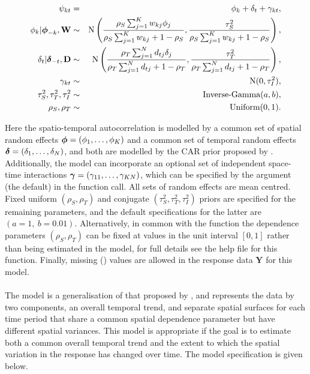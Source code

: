 \documentclass[article, nojss]{jss}
\newcommand{\bd}[1]{\ensuremath{\mbox{\boldmath $#1$}}}
\begin{document}
\begin{eqnarray}
\psi_{kt}&=&\phi_k +  \delta_t   + \gamma_{kt},\label{caranova}\\
\phi_k|\bd{\phi}_{-k},\mathbf{W}&\sim&\mbox{N}\left(\frac{\rho_{S}\sum_{j=1}^Kw_{kj}\phi_j}{\rho_{S}\sum_{j=1}^Kw_{kj} + 1-\rho_{S}}, \frac{\tau^2_{S}}{\rho_{S}\sum_{j=1}^Kw_{kj} + 1-\rho_{S}}\right),\nonumber\\
\delta_t|\bd{\delta}_{-t},\mathbf{D}&\sim&\mbox{N}\left(\frac{\rho_{T}\sum_{j=1}^N d_{tj}\delta_j}{\rho_{T}\sum_{j=1}^N d_{tj} + 1-\rho_{T}}, \frac{\tau^2_{T}}{\rho_{T}\sum_{j=1}^N d_{tj}+1-\rho_{T}}\right),\nonumber\\
\gamma_{kt}&\sim&\mbox{N}(0, \tau^2_{I} ),\nonumber\\
\tau^2_{S}, \tau^2_{T}, \tau^2_{I}&\sim&\mbox{Inverse-Gamma}(a,b),\nonumber\\
\rho_{S},\rho_{T}&\sim&\mbox{Uniform}(0,1).\nonumber
\end{eqnarray}


Here the spatio-temporal autocorrelation is modelled by a common set of spatial random effects $\bd{\phi}=(\phi_1,\ldots,\phi_K)$ and a common set of temporal random effects  $\bd{\delta}=(\delta_1,\ldots,\delta_N)$, and both are modelled by the CAR prior proposed by \cite{leroux2000}. Additionally, the model can incorporate an optional set of independent space-time interactions $\bd{\gamma}=(\gamma_{11},\ldots,\gamma_{KN})$, which can be specified by the argument  (the default) in the function call. All sets of random effects are mean centred. Fixed uniform $(\rho_{S},\rho_{T})$  and conjugate $(\tau^2_{S}, \tau^2_{T}, \tau^2_{I})$ priors are specified for the remaining parameters, and the default specifications for the latter are $(a=1,~ b=0.01)$. Alternatively, in common with the  function the  dependence parameters $(\rho_{S}, \rho_{T})$ can be fixed at values in the unit interval $[0,1]$ rather than being estimated in the model, for full details see the help file for this function. Finally, missing () values are allowed in the response data $\mathbf{Y}$ for this model.\\


\\
The model is a generalisation of that proposed by \cite{napier2016}, and represents the data by two components,  an overall temporal trend, and separate spatial surfaces for each time period that share a common spatial dependence parameter but have different spatial variances. This model is appropriate if the goal is to estimate both a common overall temporal trend and the extent to which the spatial variation in the response has changed over time. The model specification is given below.
\end{document}
